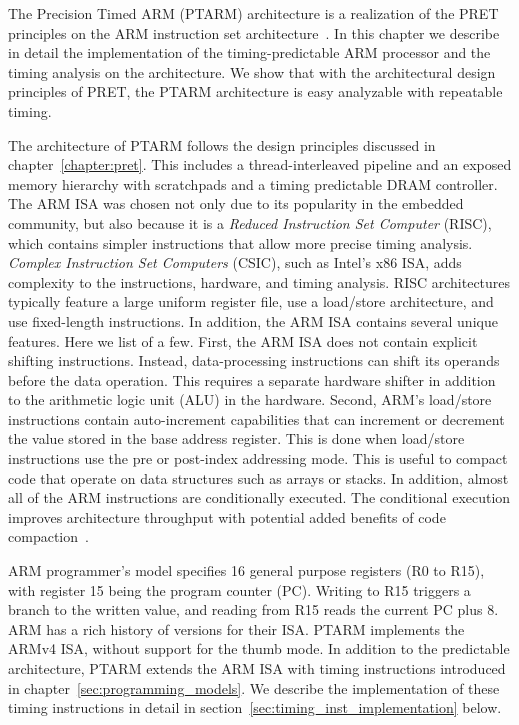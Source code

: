 The Precision Timed ARM (PTARM) architecture is a realization of the PRET principles on the ARM instruction set architecture~\cite{armrefman}. 
In this chapter we describe in detail the implementation of the timing-predictable ARM processor and the timing analysis on the architecture.
We show that with the architectural design principles of PRET, the PTARM architecture is easy analyzable with repeatable timing.
  
The architecture of PTARM follows the design principles discussed in chapter~\ref{chapter:pret}.
This includes a thread-interleaved pipeline and an exposed memory hierarchy with scratchpads and a timing predictable DRAM controller.
The ARM ISA was chosen not only due to its popularity in the embedded community, but also because it is a \emph{Reduced Instruction Set Computer} (RISC), which contains simpler instructions that allow more precise timing analysis. 
\emph{Complex Instruction Set Computers} (CSIC), such as Intel's x86 ISA, adds complexity to the instructions, hardware, and timing analysis.
RISC architectures typically feature a large uniform register file, use a load/store architecture, and use fixed-length instructions.
In addition, the ARM ISA contains several unique features. 
Here we list of a few.  
First, the ARM ISA does not contain explicit shifting instructions.
Instead, data-processing instructions can shift its operands before the data operation. 
This requires a separate hardware shifter in addition to the arithmetic logic unit (ALU) in the hardware.  
Second, ARM's load/store instructions contain auto-increment capabilities that can increment or decrement the value stored in the base address register.
This is done when load/store instructions use the pre or post-index addressing mode.   
This is useful to compact code that operate on data structures such as arrays or stacks. 
In addition, almost all of the ARM instructions are conditionally executed.
The conditional execution improves architecture throughput with potential added benefits of code compaction~\cite{cheung_code_compact_pred03}.     

ARM programmer's model specifies 16 general purpose registers (R0 to R15), with register 15 being the program counter (PC). 
Writing to R15 triggers a branch to the written value, and reading from R15 reads the current PC plus 8.
ARM has a rich history of versions for their ISA.
PTARM implements the ARMv4 ISA, without support for the thumb mode.
In addition to the predictable architecture, PTARM extends the ARM ISA with timing instructions introduced in chapter~\ref{sec:programming_models}.
We describe the implementation of these timing instructions in detail in section~\ref{sec:timing_inst_implementation} below.    

